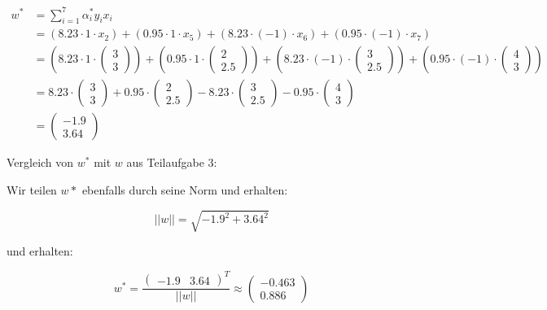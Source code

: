 \documentclass[a4paper,12pt]{article}
\begin{document}
\begin{enumerate}
	\begin{align*}
		w^* &= \sum_{i=1}^7 \alpha_i^* y_i x_i \\
			&= (8.23 \cdot 1 \cdot x_2) + (0.95 \cdot 1 \cdot x_5) + (8.23 \cdot (-1) \cdot x_6) + (0.95 \cdot (-1) \cdot x_7) \\
			&= (8.23 \cdot 1 \cdot \begin{pmatrix} 3 \\ 3 \end{pmatrix}) + (0.95 \cdot 1 \cdot \begin{pmatrix} 2 \\ 2.5 \end{pmatrix}) + (8.23 \cdot (-1) \cdot \begin{pmatrix} 3 \\ 2.5 \end{pmatrix}) + (0.95 \cdot (-1) \cdot \begin{pmatrix} 4 \\ 3 \end{pmatrix}) \\
			&= 8.23 \cdot \begin{pmatrix} 3 \\ 3 \end{pmatrix} + 0.95 \cdot \begin{pmatrix} 2 \\ 2.5 \end{pmatrix} - 8.23 \cdot \begin{pmatrix} 3 \\ 2.5 \end{pmatrix} - 0.95 \cdot \begin{pmatrix} 4 \\ 3 \end{pmatrix} \\
			&= \begin{pmatrix} -1.9 \\ 3.64 \end{pmatrix}
	\end{align*}

	 Vergleich von $w^*$ mit $w$ aus Teilaufgabe 3:

	 Wir teilen $w*$ ebenfalls durch seine Norm und erhalten:

	 \[||w|| = \sqrt{-1.9^2 + 3.64^2}\]

	 und erhalten:

	 \[ w^* = \frac{\begin{pmatrix} -1.9 & 3.64 \end{pmatrix}^T}{||w||} \approx \begin{pmatrix} -0.463 \\ 0.886 \end{pmatrix}\]


\end{enumerate}
\end{document}
